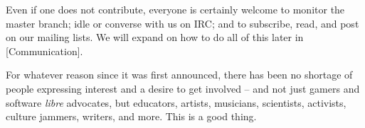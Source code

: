 Even if one does not contribute, everyone is certainly welcome to monitor the master branch; idle or converse with us on IRC; and to subscribe, read, and post on our mailing lists. We will expand on how to do all of this later in [Communication].

For whatever reason since it was first announced, there has been no shortage of people expressing interest and a desire to get involved -- and not just gamers and software {\it libre} advocates, but educators, artists, musicians, scientists, activists, culture jammers, writers, and more. This is a good thing. 


